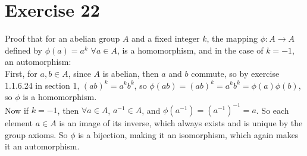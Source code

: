 \documentclass{article}
\begin{document}
    \section*{Exercise 22}
    Proof that for an abelian group $A$ and a fixed integer $k$,
    the mapping $\phi: A \to A$ defined by $\phi(a) = a^k$ $\forall a \in A$,
    is a homomorphism, and in the case of $k = -1$, an automorphism: \\
    First, for $a, b \in A$,
    since $A$ is abelian, then $a$ and $b$ commute,
    so by exercise 1.1.6.24 in section 1, $(ab)^k = a^kb^k$,
    so $\phi(ab) = (ab)^k = a^kb^k = \phi(a)\phi(b)$,
    so $\phi$ is a homomorphism. \\
    Now if $k = -1$,
    then $\forall a \in A$, $a^{-1} \in A$,
    and $\phi(a^{-1}) = (a^{-1})^{-1} = a$.
    So each element $a \in A$ is an image of its inverse,
    which always exists and is unique by the group axioms.
    So $\phi$ is a bijection,
    making it an isomorphism,
    which again makes it an automorphism.
\end{document}

